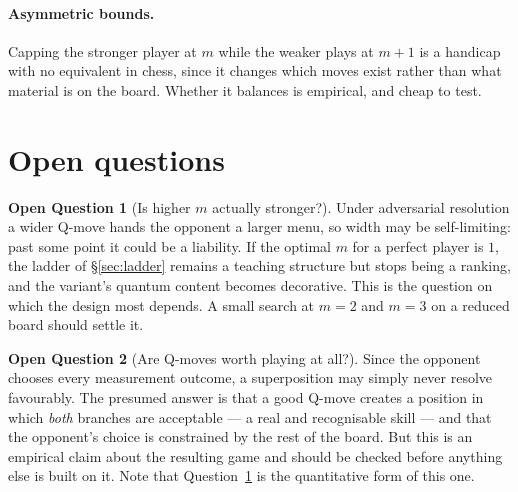 \documentclass[11pt,a4paper]{article}
\theoremstyle{definition}
\newtheorem{question}{Open Question}
\theoremstyle{plain}
\begin{document}
\paragraph{Asymmetric bounds.}
Capping the stronger player at $m$ while the weaker plays at $m+1$ is a
handicap with no equivalent in chess, since it changes which moves exist rather
than what material is on the board. Whether it balances is empirical, and cheap
to test.

\section{Open questions}
\label{sec:open}

\begin{question}[Is higher $m$ actually stronger?]
\label{q:m}
Under adversarial resolution a wider Q-move hands the opponent a larger menu,
so width may be self-limiting: past some point it could be a liability. If the
optimal $m$ for a perfect player is $1$, the ladder of \S\ref{sec:ladder}
remains a teaching structure but stops being a ranking, and the variant's
quantum content becomes decorative. This is the question on which the design
most depends. A small search at $m=2$ and $m=3$ on a reduced board should
settle it.
\end{question}

\begin{question}[Are Q-moves worth playing at all?]
\label{q:qmoves}
Since the opponent chooses every measurement outcome, a superposition may
simply never resolve favourably. The presumed answer is that a good Q-move
creates a position in which \emph{both} branches are acceptable --- a real and
recognisable skill --- and that the opponent's choice is constrained by the
rest of the board. But this is an empirical claim about the resulting game and
should be checked before anything else is built on it. Note that
Question~\ref{q:m} is the quantitative form of this one.
\end{question}
\end{document}
